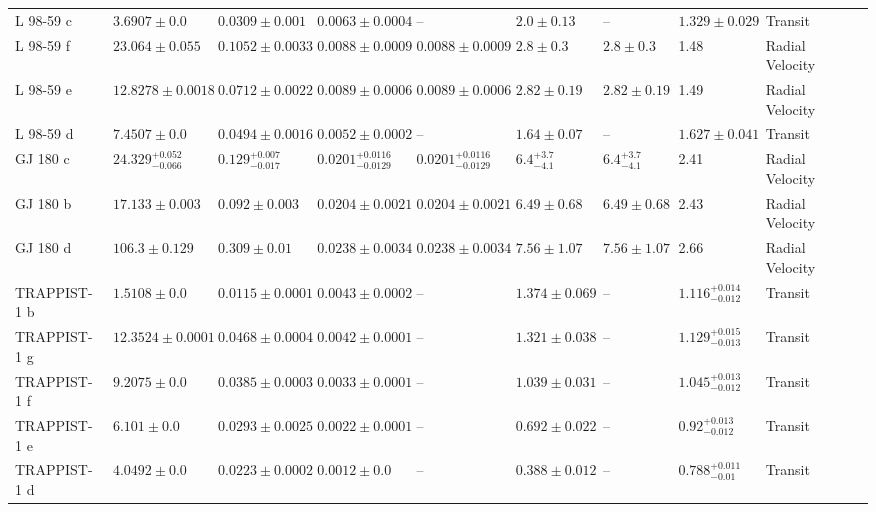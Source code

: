 \begin{tabular}{llllllllll}
L 98-59 c & $3.6907 \pm 0.0$ & $0.0309 \pm 0.001$ & $0.0063 \pm 0.0004$ & -- & $2.0 \pm 0.13$ & -- & $1.329 \pm 0.029$ & Transit & \cite{CADIEUX_ET_AL_2025} \\
L 98-59 f & $23.064 \pm 0.055$ & $0.1052 \pm 0.0033$ & $0.0088 \pm 0.0009$ & $0.0088 \pm 0.0009$ & $2.8 \pm 0.3$ & $2.8 \pm 0.3$ & 1.48 & Radial Velocity & \cite{CADIEUX_ET_AL_2025} \\
L 98-59 e & $12.8278 \pm 0.0018$ & $0.0712 \pm 0.0022$ & $0.0089 \pm 0.0006$ & $0.0089 \pm 0.0006$ & $2.82 \pm 0.19$ & $2.82 \pm 0.19$ & 1.49 & Radial Velocity & \cite{CADIEUX_ET_AL_2025} \\
L 98-59 d & $7.4507 \pm 0.0$ & $0.0494 \pm 0.0016$ & $0.0052 \pm 0.0002$ & -- & $1.64 \pm 0.07$ & -- & $1.627 \pm 0.041$ & Transit & \cite{CADIEUX_ET_AL_2025} \\
GJ 180 c & $24.329^{+0.052}_{-0.066}$ & $0.129^{+0.007}_{-0.017}$ & $0.0201^{+0.0116}_{-0.0129}$ & $0.0201^{+0.0116}_{-0.0129}$ & $6.4^{+3.7}_{-4.1}$ & $6.4^{+3.7}_{-4.1}$ & 2.41 & Radial Velocity & \cite{TUOMI_ET_AL__2014} \\
GJ 180 b & $17.133 \pm 0.003$ & $0.092 \pm 0.003$ & $0.0204 \pm 0.0021$ & $0.0204 \pm 0.0021$ & $6.49 \pm 0.68$ & $6.49 \pm 0.68$ & 2.43 & Radial Velocity & \cite{FENG_ET_AL__2020} \\
GJ 180 d & $106.3 \pm 0.129$ & $0.309 \pm 0.01$ & $0.0238 \pm 0.0034$ & $0.0238 \pm 0.0034$ & $7.56 \pm 1.07$ & $7.56 \pm 1.07$ & 2.66 & Radial Velocity & \cite{FENG_ET_AL__2020} \\
TRAPPIST-1 b & $1.5108 \pm 0.0$ & $0.0115 \pm 0.0001$ & $0.0043 \pm 0.0002$ & -- & $1.374 \pm 0.069$ & -- & $1.116^{+0.014}_{-0.012}$ & Transit & \cite{AGOL_ET_AL__2021} \\
TRAPPIST-1 g & $12.3524 \pm 0.0001$ & $0.0468 \pm 0.0004$ & $0.0042 \pm 0.0001$ & -- & $1.321 \pm 0.038$ & -- & $1.129^{+0.015}_{-0.013}$ & Transit & \cite{AGOL_ET_AL__2021} \\
TRAPPIST-1 f & $9.2075 \pm 0.0$ & $0.0385 \pm 0.0003$ & $0.0033 \pm 0.0001$ & -- & $1.039 \pm 0.031$ & -- & $1.045^{+0.013}_{-0.012}$ & Transit & \cite{AGOL_ET_AL__2021} \\
TRAPPIST-1 e & $6.101 \pm 0.0$ & $0.0293 \pm 0.0025$ & $0.0022 \pm 0.0001$ & -- & $0.692 \pm 0.022$ & -- & $0.92^{+0.013}_{-0.012}$ & Transit & \cite{AGOL_ET_AL__2021} \\
TRAPPIST-1 d & $4.0492 \pm 0.0$ & $0.0223 \pm 0.0002$ & $0.0012 \pm 0.0$ & -- & $0.388 \pm 0.012$ & -- & $0.788^{+0.011}_{-0.01}$ & Transit & \cite{AGOL_ET_AL__2021} \\

\end{tabular}
